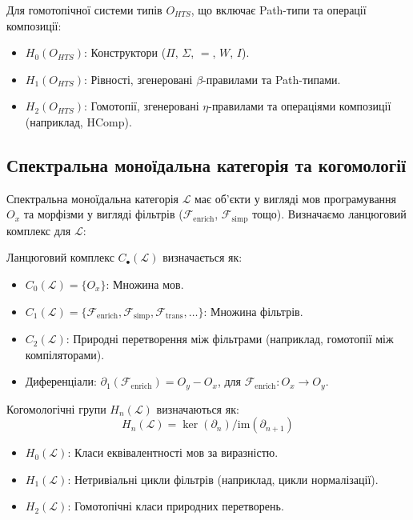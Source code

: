 \begin{example}
Для гомотопічної системи типів \( O_{HTS} \), що включає Path-типи та операції композиції:
\begin{itemize}
    \item \( H_0(O_{HTS}) \): Конструктори (\(\Pi\), \(\Sigma\), \(=\), \(W\), \(I\)).
    \item \( H_1(O_{HTS}) \): Рівності, згенеровані \(\beta\)-правилами та Path-типами.
    \item \( H_2(O_{HTS}) \): Гомотопії, згенеровані \(\eta\)-правилами та операціями композиції (наприклад, \(\text{HComp}\)).
\end{itemize}
\end{example}

\subsection{Спектральна моноїдальна категорія та когомології}
Спектральна моноїдальна категорія \(\mathcal{L}\) має об’єкти у вигляді мов програмування \( O_x \) та морфізми у вигляді фільтрів (\(\mathcal{F}_{\text{enrich}}\), \(\mathcal{F}_{\text{simp}}\) тощо). Визначаємо ланцюговий комплекс для \(\mathcal{L}\):

\begin{definition}
Ланцюговий комплекс \( C_\bullet(\mathcal{L}) \) визначається як:
\begin{itemize}
    \item \( C_0(\mathcal{L}) = \{O_x\} \): Множина мов.
    \item \( C_1(\mathcal{L}) = \{\mathcal{F}_{\text{enrich}}, \mathcal{F}_{\text{simp}}, \mathcal{F}_{\text{trans}}, \dots\} \): Множина фільтрів.
    \item \( C_2(\mathcal{L}) \): Природні перетворення між фільтрами (наприклад, гомотопії між компіляторами).
    \item Диференціали: \( \partial_1(\mathcal{F}_{\text{enrich}}) = O_y - O_x \), для \(\mathcal{F}_{\text{enrich}}: O_x \to O_y \).
\end{itemize}
\end{definition}

\begin{definition}
Когомологічні групи \( H_n(\mathcal{L}) \) визначаються як:
\[
H_n(\mathcal{L}) = \ker(\partial_n) / \text{im}(\partial_{n+1})
\]
\begin{itemize}
    \item \( H_0(\mathcal{L}) \): Класи еквівалентності мов за виразністю.
    \item \( H_1(\mathcal{L}) \): Нетривіальні цикли фільтрів (наприклад, цикли нормалізації).
    \item \( H_2(\mathcal{L}) \): Гомотопічні класи природних перетворень.
\end{itemize}
\end{definition}

